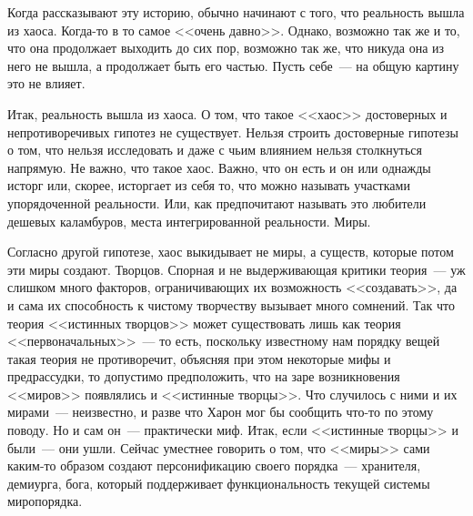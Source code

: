 Когда рассказывают эту историю, обычно начинают с того, что реальность вышла из 
хаоса. Когда-то в то самое <<очень давно>>. Однако, возможно так же и то, что 
она 
продолжает выходить до сих пор, возможно так же, что никуда она из него не 
вышла, а продолжает быть его частью. Пусть себе~--- на общую картину это не 
влияет.

Итак, реальность вышла из хаоса. О том, что такое <<хаос>> достоверных и 
непротиворечивых гипотез не существует. Нельзя строить достоверные гипотезы о 
том, что нельзя исследовать и даже с чьим влиянием нельзя столкнуться напрямую. 
Не важно, что такое хаос. Важно, что он есть и он или однажды исторг или, 
скорее, исторгает из себя то, что можно называть участками упорядоченной 
реальности. Или, как предпочитают называть это любители дешевых каламбуров, 
места интегрированной реальности. Миры.

Согласно другой гипотезе, хаос выкидывает не миры, а существ, которые потом эти 
миры создают. Творцов. Спорная и не выдерживающая критики теория~--- уж слишком 
много факторов, ограничивающих их возможность <<создавать>>, да и сама их 
способность к чистому творчеству вызывает много сомнений. Так что теория 
<<истинных творцов>> может существовать лишь как теория <<первоначальных>>~--- 
то 
есть, поскольку известному нам порядку вещей такая теория не противоречит, 
объясняя при этом некоторые мифы и предрассудки, то допустимо предположить, что 
на заре возникновения <<миров>> появлялись и <<истинные творцы>>. Что случилось 
с 
ними и их мирами~--- неизвестно, и разве что Харон мог бы сообщить 
что-то по этому поводу. Но и сам он~--- практически миф. Итак, если <<истинные 
творцы>> и были~--- они ушли. Сейчас уместнее говорить о том, что <<миры>> сами 
каким-то образом создают персонификацию своего порядка~--- хранителя, демиурга, 
бога, который поддерживает функциональность текущей системы миропорядка.

